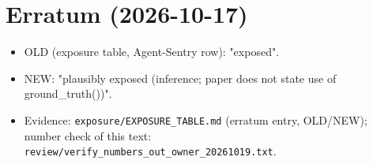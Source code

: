 \documentclass[10pt]{article}
\providecommand{\tightlist}{\setlength{\itemsep}{0pt}\setlength{\parskip}{0pt}}
\begin{document}
\section{Erratum (2026-10-17)}\label{erratum-2026-10-17}

\begin{itemize}
\tightlist
\item
  OLD (exposure table, Agent-Sentry row): "exposed".
\item
  NEW: "plausibly exposed (inference; paper does not state use of ground\_truth())".
\item
  Evidence: \texttt{exposure/\allowbreak{}EXPOSURE\_\allowbreak{}TABLE.md} (erratum entry, OLD/NEW); number check of this text: \texttt{review/\allowbreak{}verify\_\allowbreak{}numbers\_\allowbreak{}out\_\allowbreak{}owner\_\allowbreak{}20261019.txt}.
\end{itemize}
\end{document}
